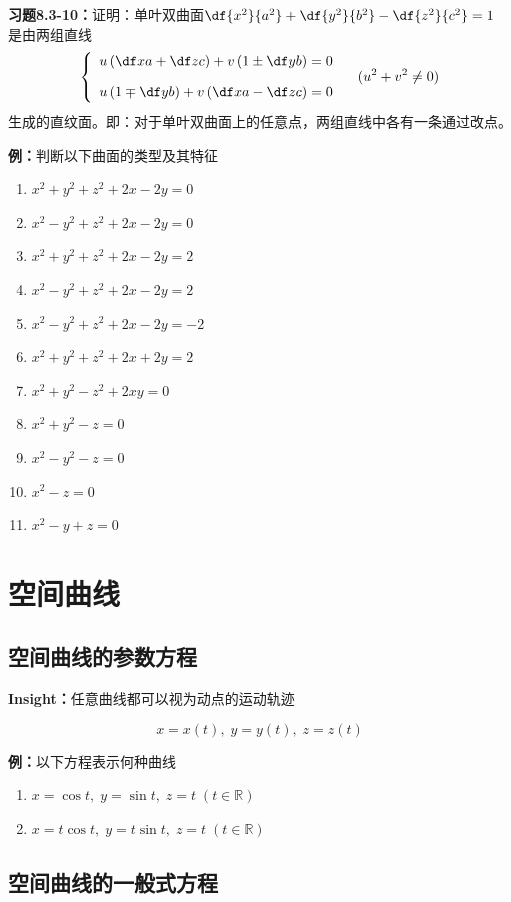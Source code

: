 {\bf 习题8.3-10：}证明：单叶双曲面$\df{x^2}{a^2}+\df{y^2}{b^2}-\df{z^2}{c^2}=1$
是由两组直线
$$\left\{\begin{array}{l}
	u\left(\df xa+\df zc\right)+v\left(1\pm\df yb\right)=0\\[1em]
	u\left(1\mp\df yb\right)+v\left(\df xa-\df zc\right)=0
\end{array}\right.\quad (u^2+v^2\ne 0)$$
生成的直纹面。即：对于单叶双曲面上的任意点，两组直线中各有一条通过改点。

{\bf 例：}判断以下曲面的类型及其特征
\begin{enumerate}[(1)]
  \setlength{\itemindent}{1cm}
  \item $x^2+y^2+z^2+2x-2y=0$
  \item $x^2-y^2+z^2+2x-2y=0$
  \item $x^2+y^2+z^2+2x-2y=2$
  \item $x^2-y^2+z^2+2x-2y=2$
  \item $x^2-y^2+z^2+2x-2y=-2$
  \item $x^2+y^2+z^2+2x+2y=2$
  \item $x^2+y^2-z^2+2xy=0$
  \item $x^2+y^2-z=0$
  \item $x^2-y^2-z=0$
  \item $x^2-z=0$
  \item $x^2-y+z=0$
\end{enumerate}

\section{空间曲线}

\subsection{空间曲线的参数方程}

{\bf Insight：}任意曲线都可以视为动点的运动轨迹

$${x=x(t),\;y=y(t),\;z=z(t)}$$

{\bf 例：}以下方程表示何种曲线
\begin{enumerate}
  \item $x=\cos t,\;y=\sin t,\;z=t\;(t\in\mathbb{R})$ 
  \item $x=t\cos t,\;y=t\sin t,\;z=t\;(t\in\mathbb{R})$ 
\end{enumerate}

\subsection{空间曲线的一般式方程}

